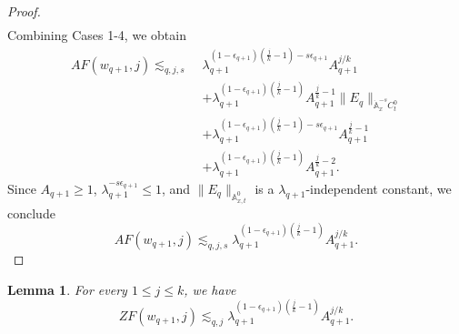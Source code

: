 \documentclass[12pt,reqno,letterpaper]{amsart}
\numberwithin{equation}{section}
\newcommand{\1}{{\bf 1}}
\newcommand{\2}{{\bf 2}}
\newtheorem{lemma}[theorem]{Lemma}
\theoremstyle{remark}
\theoremstyle{remark}
\begin{document}
\begin{proof}
\[\begin{aligned}
\end{aligned}
\] 
Combining Cases 1-4, we obtain
\[
\begin{aligned}
AF(w_{q+1},j)
\lesssim_{q,j,s}\;&
\lambda_{q+1}^{(1-\epsilon_{q+1})(\frac jk-1)-s\epsilon_{q+1}}
A_{q+1}^{j/k}
\\
&+
\lambda_{q+1}^{(1-\epsilon_{q+1})(\frac jk-1)}
A_{q+1}^{\frac jk-1}
\|E_q\|_{\dot{\mathbb A}^{-s}_xC_t^0}
\\
&+
\lambda_{q+1}^{(1-\epsilon_{q+1})(\frac jk-1)-s\epsilon_{q+1}}
A_{q+1}^{\frac jk-1}
\\
&+
\lambda_{q+1}^{(1-\epsilon_{q+1})(\frac jk-1)}
A_{q+1}^{\frac jk-2}.
\end{aligned}
\]
Since $A_{q+1}\geq1$, $\lambda_{q+1}^{-s\epsilon_{q+1}}\leq1$, and
$\|E_q\|_{\mathbb{A}_{x,t}^{0}}$ is a $\lambda_{q+1}$-independent constant, we conclude
\[
AF(w_{q+1},j)
\lesssim_{q,j,s}
\lambda_{q+1}^{(1-\epsilon_{q+1})(\frac jk-1)}
A_{q+1}^{j/k}.
\]
\end{proof}
\begin{lemma}\label{lem:horrible2}
For every $1\leq j\leq k$, we have
\[
    ZF(w_{q+1},j)
    \lesssim_{q,j}
    \lambda_{q+1}^{(1-\epsilon_{q+1})(\frac jk-1)}
    A_{q+1}^{j/k}.
\]
\end{lemma}
\end{document}
